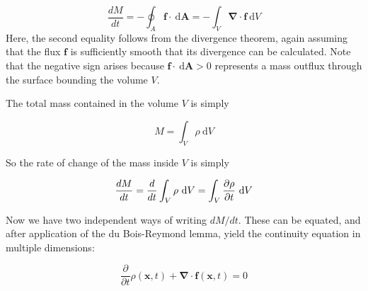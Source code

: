 \documentclass[notoc]{tufte-handout}
\renewcommand{\vec}[1]{\mathbf{#1}}
\newcommand{\del}{\vec{\nabla}}
\begin{document}
\begin{equation}
      \frac{d M}{d t}  =  - \oint_A  \vec {f} \cdot ~\mathrm{d}\vec {A} =  - \int_V  \del \cdot  \vec {f}  ~\mathrm{d} {V}
\end{equation}
%
Here, the second equality follows from the divergence theorem, again assuming that the flux $\vec {f}$ is sufficiently smooth that its divergence can be calculated.  Note that the negative sign arises because $\vec {f} \cdot ~\mathrm{d}\vec {A} > 0$ represents a mass outflux through the surface bounding the volume $V$.

The total mass contained in the volume $V$ is simply

\begin{equation}
     M =  \int_V  \rho ~\mathrm{d} {V}
\end{equation}

So the rate of change of the mass inside $V$  is simply

\begin{equation}
     \frac{d M}{d t} =  \frac{d}{d t} \int_V  \rho ~\mathrm{d} {V}   =  \int_V  {\partial \rho \over \partial t} ~\mathrm{d} {V}
\end{equation}
%

Now we have two independent ways of writing $ d M /  dt$. These can be equated, and after application of the du Bois-Reymond lemma, yield the continuity equation in multiple dimensions:



\begin{equation}
    \frac{\partial}{\partial t} \rho(\vec{x},t) + \del\cdot \vec{f}(\vec{x},t) = 0
\end{equation}
\end{document}
